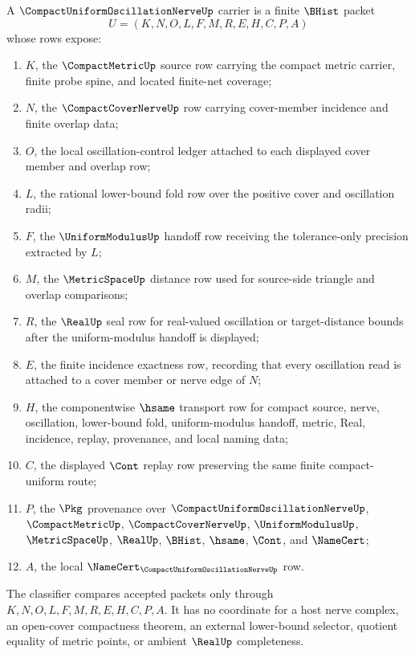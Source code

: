 \begin{definition}
\label{def:compact-uniform-oscillation-nerve-carrier}
A $\CompactUniformOscillationNerveUp$ carrier is a finite $\BHist$ packet
$$
U=(K,N,O,L,F,M,R,E,H,C,P,A)
$$
whose rows expose:
\begin{enumerate}
\item $K$, the $\CompactMetricUp$ source row carrying the compact metric carrier, finite probe spine, and located finite-net coverage;
\item $N$, the $\CompactCoverNerveUp$ row carrying cover-member incidence and finite overlap data;
\item $O$, the local oscillation-control ledger attached to each displayed cover member and overlap row;
\item $L$, the rational lower-bound fold row over the positive cover and oscillation radii;
\item $F$, the $\UniformModulusUp$ handoff row receiving the tolerance-only precision extracted by $L$;
\item $M$, the $\MetricSpaceUp$ distance row used for source-side triangle and overlap comparisons;
\item $R$, the $\RealUp$ seal row for real-valued oscillation or target-distance bounds after the uniform-modulus handoff is displayed;
\item $E$, the finite incidence exactness row, recording that every oscillation read is attached to a cover member or nerve edge of $N$;
\item $H$, the componentwise $\hsame$ transport row for compact source, nerve, oscillation, lower-bound fold, uniform-modulus handoff, metric, Real, incidence, replay, provenance, and local naming data;
\item $C$, the displayed $\Cont$ replay row preserving the same finite compact-uniform route;
\item $P$, the $\Pkg$ provenance over $\CompactUniformOscillationNerveUp$, $\CompactMetricUp$, $\CompactCoverNerveUp$, $\UniformModulusUp$, $\MetricSpaceUp$, $\RealUp$, $\BHist$, $\hsame$, $\Cont$, and $\NameCert$;
\item $A$, the local $\NameCert_{\CompactUniformOscillationNerveUp}$ row.
\end{enumerate}
The classifier compares accepted packets only through $K,N,O,L,F,M,R,E,H,C,P,A$. It has no coordinate for a host nerve complex, an open-cover compactness theorem, an external lower-bound selector, quotient equality of metric points, or ambient $\RealUp$ completeness.
\end{definition}

